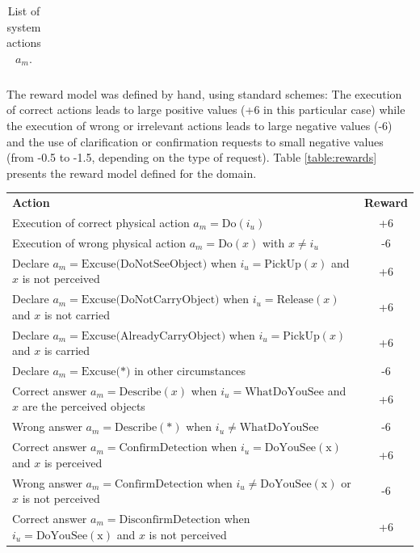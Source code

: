 \begin{table}[p]
\begin{footnotesize}
\begin{tabular}{p{60mm}}
\end{tabular}
\end{footnotesize}
 \caption{List of system actions $a_m$.} 
\label{table:systemdas_exp2}
\end{table}

The reward model was defined by hand, using standard schemes: The execution of correct actions leads to large positive values (+6 in this particular case) while the execution of wrong or irrelevant actions leads to large negative values (-6) and the use of clarification or confirmation requests to small negative values (from -0.5 to -1.5, depending on the type of request). Table \ref{table:rewards} presents the reward model defined for the domain. 

\begin{table}[ht]
\begin{center}
\begin{footnotesize}
\begin{tabular}{p{130mm}c} 
\centering \textbf{Action} & \textbf{Reward} \\
Execution of correct physical action $a_m\!=\!\mathrm{Do}(i_u)$ & +6 \\
Execution of wrong physical action $a_m\!=\!\mathrm{Do}(x)$ with $x\!\neq\!i_u$ & -6  \\
Declare $a_m\!=\!\mathrm{Excuse(DoNotSeeObject})$ when $i_u\!=\!\mathrm{PickUp}(x)$ and $x$ is not perceived & +6 \\
Declare $a_m\!=\!\mathrm{Excuse(DoNotCarryObject})$ when $i_u\!=\!\mathrm{Release}(x)$ and $x$ is not carried & +6 \\
Declare $a_m\!=\!\mathrm{Excuse(AlreadyCarryObject})$ when $i_u\!=\!\mathrm{PickUp}(x)$ and $x$ is carried & +6 \\
Declare $a_m\!=\!\mathrm{Excuse(*})$ in other circumstances & -6 \\
Correct answer $a_m\!=\!\mathrm{Describe}(x)$ when $i_u\!=\!\mathrm{WhatDoYouSee}$ and $x$ are the perceived objects & +6 \\
Wrong answer $a_m\!=\!\mathrm{Describe}(*)$ when $i_u\!\neq\!\mathrm{WhatDoYouSee}$ & -6 \\
Correct answer $a_m\!=\!\mathrm{ConfirmDetection}$ when $i_u\!=\!\mathrm{DoYouSee(x)}$ and $x$ is perceived & +6 \\
Wrong answer $a_m\!=\!\mathrm{ConfirmDetection}$ when $i_u\!\neq\!\mathrm{DoYouSee(x)}$ or $x$ is not perceived & -6 \\
Correct answer $a_m\!=\!\mathrm{DisconfirmDetection}$ when $i_u\!=\!\mathrm{DoYouSee(x)}$ and $x$ is not perceived & +6 \\

\end{tabular}
\end{footnotesize}
\end{center}
\end{table}
